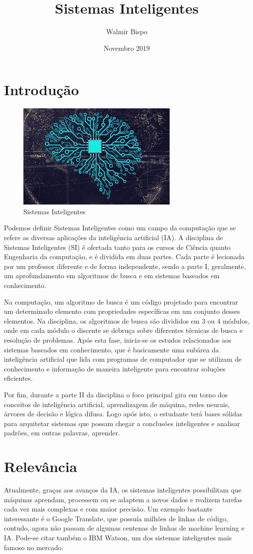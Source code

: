 \documentclass[10pt]{paper}
\title{Sistemas Inteligentes}
\author{Walmir Bispo }
\date{Novembro 2019}
\begin{document}
\section{Introdução}


\begin{figure}[!htb]
\centering
\includegraphics[scale = 0.7]{SI.jpg}
\caption{Sistemas Inteligentes}
\label{Rotulo}
\end{figure}

Podemos definir Sistemas Inteligentes como um campo da computação que se refere as diversas aplicações da inteligência artificial (IA). A disciplina de Sistemas Inteligentes (SI) é ofertada tanto para os cursos de Ciência quanto Engenharia da computação, e é dividida em duas partes. Cada parte é lecionada por um professor diferente e de forma independente, sendo a parte I, geralmente, um aprofundamento em algoritmos de busca e em sistemas baseados em conhecimento.

Na computação, um algoritmo de busca é um código projetado para encontrar um determinado elemento com propriedades específicas em um conjunto desses elementos. Na disciplina, os algoritmos de busca são divididos em 3 ou 4 módulos, onde em cada módulo o discente se debruça sobre diferentes técnicas de busca e resolução de problemas. Após esta fase, inicia-se os estudos relacionados aos sistemas baseados em conhecimento, que é basicamente uma subárea da inteligência artificial que lida com programas de computador que se utilizam de conhecimento e informação de maneira inteligente para encontrar soluções eficientes. \cite{cinwiki_SI}

Por fim, durante a parte II da disciplina o foco principal gira em torno dos conceitos de inteligência artificial, aprendizagem de máquina, redes neurais, árvores de decisão e lógica difusa. Logo após isto, o estudante terá bases sólidas para arquitetar sistemas que possam chegar a conclusões inteligentes e analisar padrões, em outras palavras, aprender.

\section{Relevância}
Atualmente, graças aos avanços da IA, os sistemas inteligentes possibilitam que máquinas aprendam, processem ou se adaptem a novos dados e realizem tarefas cada vez mais complexas e com maior precisão. Um exemplo bastante interessante é o Google Translate, que possuía milhões de linhas de código, contudo, agora não passam de algumas centenas de linhas de machine learning e IA. Pode-se citar também o IBM Watson, um dos sistemas inteligentes mais famoso no mercado.
\end{document}
